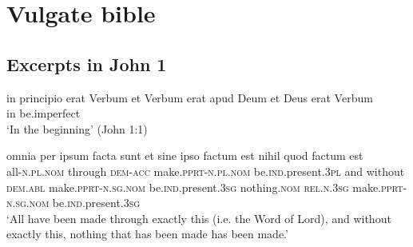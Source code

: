 \documentclass[a4paper, oneside]{report}
\newcommand*{\category}[1]{\textsc{#1}}
\newcommand{\translate}[1]{`#1'}
\begin{document}
\section{Vulgate bible}

\subsection{Excerpts in John 1}\label{sec:text.vulgate.john}

\begin{exe}
    \ex\label{ex:text.john.1.1} 
    \gll in principio erat Verbum et Verbum erat apud Deum et Deus erat Verbum \\
    in {} be.\acs{imperfect}  \\
    \glt \translate{In the beginning} (John 1:1)
    
    \ex\label{ex:text.john.1.3}
    \gll omnia per ipsum facta sunt 
    et sine ipso factum est nihil quod factum est \\
    all-\category{n}.\category{pl}.\category{nom} through \category{dem}-\category{acc}
    make.\category{pprt}-\category{n}.\category{pl}.\category{nom} 
    be.\category{ind}.\acs{present}.\category{3pl} 
    and without \category{dem}.\category{abl} 
    make.\category{pprt}-\category{n}.\category{sg}.\category{nom} 
    be.\category{ind}.\acs{present}.\category{3sg}
    nothing.\category{nom}
    \category{rel}.\category{n}.\category{3sg}
    make.\category{pprt}-\category{n}.\category{sg}.\category{nom} 
    be.\category{ind}.\acs{present}.\category{3sg} \\
    \glt \translate{All have been made through exactly this (i.e. the Word of Lord),
    and without exactly this, nothing that has been made has been made.}
\end{exe}
\end{document}

